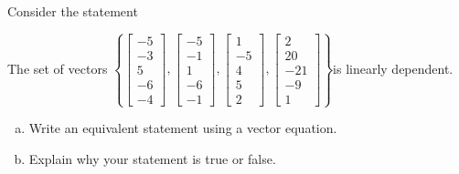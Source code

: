 
\begin{exerciseStatement}


Consider the statement 
\begin{center}\begin{minipage}{0.8\textwidth}
 The set of vectors \( \left\{ \left[\begin{array}{c}
-5 \\
-3 \\
5 \\
-6 \\
-4
\end{array}\right] , \left[\begin{array}{c}
-5 \\
-1 \\
1 \\
-6 \\
-1
\end{array}\right] , \left[\begin{array}{c}
1 \\
-5 \\
4 \\
5 \\
2
\end{array}\right] , \left[\begin{array}{c}
2 \\
20 \\
-21 \\
-9 \\
1
\end{array}\right] \right\} \)is linearly dependent.
\end{minipage}\end{center}
    


\begin{enumerate}[(a)]
\item  Write an equivalent statement using a vector equation.
\item  Explain why your statement is true or false.
\end{enumerate}
    
\end{exerciseStatement}
    
